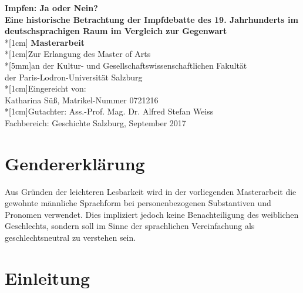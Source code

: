 \documentclass[
    a4paper,
    12pt,
    hyphens,
    chapterprefix=true,
    headheight=33pt,
    footheight=29pt,
    headings=optiontohead, %
]{scrartcl}
\begin{document}
\thispagestyle{empty}
\begin{center}

\textbf{
{\Large
    Impfen: Ja oder Nein? \\
    Eine historische Betrachtung der Impfdebatte des 19. Jahrhunderts im deutschsprachigen Raum im Vergleich zur Gegenwart
    }
}
\\*[1cm]\Large { \textbf{Masterarbeit}
\\*[1cm]Zur Erlangung des Master of Arts
\\*[5mm]an der Kultur- und Gesellschaftswissenschaftlichen Fakultät
\\der Paris-Lodron-Universität Salzburg
\\*[1cm]Eingereicht von:
\\Katharina Süß, Matrikel-Nummer 0721216
\\*[1cm]Gutachter: Ass.-Prof. Mag. Dr. Alfred Stefan Weiss
\\Fachbereich: Geschichte
\vfill
Salzburg, September 2017
}

\end{center}


\newpage
\tableofcontents
\newpage



\section{Gendererklärung}
Aus Gründen der leichteren Lesbarkeit wird in der vorliegenden Masterarbeit die gewohnte männliche Sprachform bei personenbezogenen Substantiven und Pronomen verwendet. Dies impliziert jedoch keine Benachteiligung des weiblichen Geschlechts, sondern soll im Sinne der sprachlichen Vereinfachung als geschlechtsneutral zu verstehen sein.
\newpage


\section{Einleitung}
\end{document}
